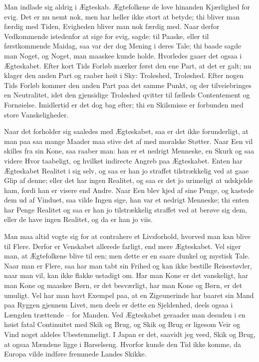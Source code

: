 \documentclass[12pt,a4paper]{article}
\begin{document}
Man indlade sig aldrig i Ægteskab. Ægtefolkene de love hinanden Kjærlighed for evig. Det er nu nemt nok, men har heller ikke stort at betyde; thi bliver man færdig med Tiden, Evigheden bliver man nok færdig med. Naar derfor Vedkommende istedenfor at sige for evig, sagde: til Paaske, eller til førstkommende Maidag, saa var der dog Mening i deres Tale; thi baade sagde man Noget, og Noget, man maaskee kunde holde. Hvorledes gaaer det ogsaa i Ægteskabet. Efter kort Tids Forløb mærker først den ene Part, at det er galt; nu klager den anden Part og raaber høit i Sky: Troløshed, Troløshed. Efter nogen Tids Forløb kommer den anden Part paa det samme Punkt, og der tilveiebringes en Neutralitet, idet den gjensidige Troløshed qvitter til fælleds Contentement og Fornøielse. Imidlertid er det dog bag efter; thi en Skilsmisse er forbunden med store Vanskeligheder.

Naar det forholder sig saaledes med Ægteskabet, saa er det ikke forunderligt, at man paa saa mange Maader maa stive det af med moralske Støtter. Naar Een vil skilles fra sin Kone, saa raaber man: han er et nedrigt Menneske, en Skurk og saa videre Hvor taabeligt, og hvilket indirecte Angreb paa Ægteskabet. Enten har Ægteskabet Realitet i sig selv, og saa er han jo straffet tilstrækkelig ved at gaae Glip af denne; eller det har ingen Realitet, og saa er det jo urimeligt at udskjelde ham, fordi han er visere end Andre. Naar Een blev kjed af sine Penge, og kastede dem ud af Vinduet, saa vilde Ingen sige, han var et nedrigt Menneske; thi enten har Penge Realitet og saa er han jo tilstrækkelig straffet ved at berøve sig dem, eller de have ingen Realitet, og da er han jo viis.

Man maa altid vogte sig for at contrahere et Livsforhold, hvorved man kan blive til Flere. Derfor er Venskabet allerede farligt, end mere Ægteskabet. Vel siger man, at Ægtefolkene blive til een; men dette er en saare dunkel og mystisk Tale. Naar man er Flere, saa har man tabt sin Frihed og kan ikke bestille Reisestøvler, naar man vil, kan ikke flakke ustadigt om. Har man Kone er det vanskeligt, har man Kone og maaskee Børn, er det besværligt, har man Kone og Børn, er det umuligt. Vel har man havt Exempel paa, at en Zigeunerinde har baaret sin Mand paa Ryggen gjennem Livet, men deels er dette en Sjeldenhed, deels ogsaa i Længden trættende – for Manden. Ved Ægteskabet geraader man desuden i en høist fatal Continuitet med Skik og Brug, og Skik og Brug er ligesom Veir og Vind noget aldeles Ubestemmeligt. I Japan er det, saavidt jeg veed, Skik og Brug, at ogsaa Mændene ligge i Barselseng. Hvorfor kunde den Tid ikke komme, da Europa vilde indføre fremmede Landes Skikke.
\end{document}
